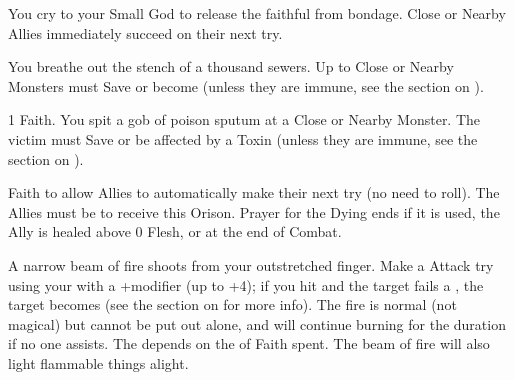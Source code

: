 \begin{multicols*}{2}
\LITURGY [
  Name = On Your Feet,
  Link = arcana-mystery-on-your-feet,
  Paradigm = Errant,
  Duration=1 Combat Action
]

You cry to your Small God to release the faithful from bondage. \DICE Close or Nearby Allies immediately succeed on their next \Duration try.

\LITURGY [
  Name = Pestilential Breath,
  Link = arcana-mystery-pestilential-breath,
  Paradigm = Civilized,
  Duration=1 Combat Action
]

You breathe out the stench of a thousand sewers. Up to \DICE Close or Nearby Monsters must Save or become  (unless they are immune, see the section on ).

\LITURGY [
  Name = Poison Spittle,
  Link = arcana-mystery-poison-spittle,
  Paradigm = Monstrous,
  Duration=1 Combat Action
]

 1 Faith. You spit a gob of poison sputum at a Close or Nearby Monster. The victim must Save or be affected by a  Toxin (unless they are immune, see the section on ).

\LITURGY [
  Name = Prayer for the Dying,
  Link = arcana-mystery-prayer-dying,
  Paradigm = J{\UmlautO}tnar,
  Duration=1 Combat Action
]

 \DICE Faith to allow \DICE Allies to automatically make their next \DEATH try (no need to roll). The Allies must be  to receive this Orison. Prayer for the Dying ends if it is used, the Ally is healed above 0 Flesh, or at the end of Combat. 

\LITURGY [
  Name = Ray of Fire,
  Link = arcana-mystery-ray-of-fire,
  Paradigm = J{\UmlautO}tnar,
  Duration=1 Combat Action
]

A narrow beam of fire shoots from your outstretched finger.  Make a Attack try using your \FOC with a +\DICE modifier (up to +4); if you hit and the target fails a , the target becomes  (see the section on  for more info). The fire is normal (not magical) but cannot be put out alone, and  will continue burning for the duration if no one assists. The \Duration depends on the \DICE of Faith spent. The beam of fire will also light flammable things alight.

\LITURGY [
  Name = Resonating Command,
  Link = arcana-mystery-resonating-command,
  Paradigm = Righteous,
  Duration=1 Combat Action
]


\end{multicols*}
